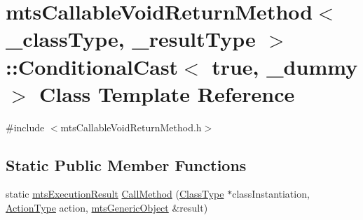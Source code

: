 \hypertarget{classmts_callable_void_return_method_1_1_conditional_cast_3_01true_00_01__dummy_01_4}{\section{mts\-Callable\-Void\-Return\-Method$<$ \-\_\-class\-Type, \-\_\-result\-Type $>$\-:\-:Conditional\-Cast$<$ true, \-\_\-dummy $>$ Class Template Reference}
\label{classmts_callable_void_return_method_1_1_conditional_cast_3_01true_00_01__dummy_01_4}
}


{\ttfamily \#include $<$mts\-Callable\-Void\-Return\-Method.\-h$>$}

\subsection*{Static Public Member Functions}
\begin{DoxyCompactItemize}
\item 
static \hyperlink{classmts_execution_result}{mts\-Execution\-Result} \hyperlink{classmts_callable_void_return_method_1_1_conditional_cast_3_01true_00_01__dummy_01_4_ab99bf85a3c5d260e43db1b39f24947cf}{Call\-Method} (\hyperlink{classmts_callable_void_return_method_a2bea77e5dd239ec2a1d3558dd3ca1776}{Class\-Type} $\ast$class\-Instantiation, \hyperlink{classmts_callable_void_return_method_a7f1f533b8d1e55b4b35d03dc80017101}{Action\-Type} action, \hyperlink{classmts_generic_object}{mts\-Generic\-Object} \&result)
\end{DoxyCompactItemize}


